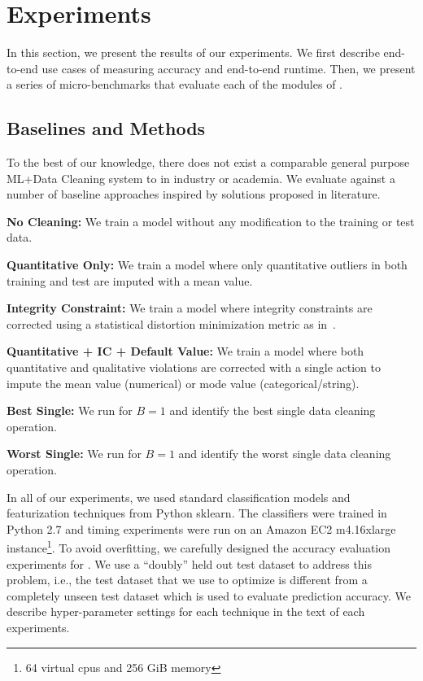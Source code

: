\section{Experiments}
In this section, we present the results of our experiments.
We first describe end-to-end use cases of \sys measuring accuracy and end-to-end runtime.
Then, we present a series of micro-benchmarks that evaluate each of the modules of \sys.

\subsection{Baselines and Methods}
To the best of our knowledge, there does not exist a comparable general purpose ML+Data Cleaning system to \sys in industry or academia.
We evaluate \sys against a number of baseline approaches inspired by solutions proposed in literature. 

\vspace{0.25em}\noindent\textbf{No Cleaning: } We train a model without any modification to the training or test data.

\vspace{0.25em}\noindent\textbf{Quantitative Only: } We train a model where only quantitative outliers in both training and test are imputed with a mean value. 

\vspace{0.25em}\noindent\textbf{Integrity Constraint: } We train a model where integrity constraints are corrected using a statistical distortion minimization metric as in~\cite{prokoshyna2015combining}.

\vspace{0.25em}\noindent\textbf{Quantitative + IC + Default Value: } We train a model where both quantitative and qualitative violations are corrected with a single action to impute the mean value (numerical) or mode value (categorical/string).

\vspace{0.25em}\noindent\textbf{Best Single: } We run \sys for $B=1$ and identify the best single data cleaning operation.

\vspace{0.25em}\noindent\textbf{Worst Single: } We run \sys for $B=1$ and identify the worst single data cleaning operation.

\vspace{0.25em}
In all of our experiments, we used standard classification models and featurization techniques from Python \textsf{sklearn}.
The classifiers were trained in Python 2.7 and timing experiments were run on an Amazon EC2 m4.16xlarge instance\footnote{64 virtual cpus and 256 GiB memory}.
To avoid overfitting, we carefully designed the accuracy evaluation experiments for \sys.
We use a ``doubly'' held out test dataset to address this problem, i.e., the test dataset that we use to optimize \sys is different from a completely unseen test dataset which is used to evaluate prediction accuracy.
We describe hyper-parameter settings for each technique in the text of each experiments.

